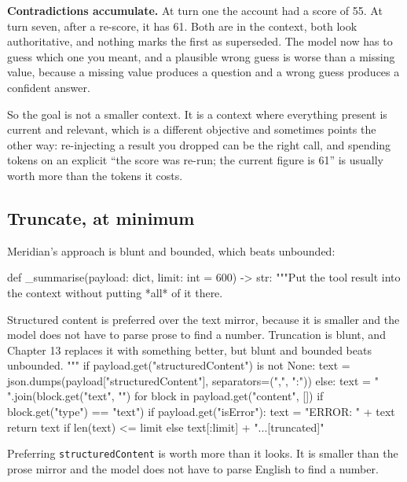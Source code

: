 \textbf{Contradictions accumulate.} At turn one the account had a score of 55. At
turn seven, after a re-score, it has 61. Both are in the context, both look
authoritative, and nothing marks the first as superseded. The model now has to
guess which one you meant, and a plausible wrong guess is worse than a missing
value, because a missing value produces a question and a wrong guess produces a
confident answer.

So the goal is not a smaller context. It is a context where everything present is
current and relevant, which is a different objective and sometimes points the
other way: re-injecting a result you dropped can be the right call, and spending
tokens on an explicit ``the score was re-run; the current figure is 61'' is
usually worth more than the tokens it costs.


\subsection{Truncate, at minimum}

Meridian's approach is blunt and bounded, which beats unbounded:

\begin{py}
def _summarise(payload: dict, limit: int = 600) -> str:
    """Put the tool result into the context without putting *all* of it there.

    Structured content is preferred over the text mirror, because it is smaller
    and the model does not have to parse prose to find a number. Truncation is
    blunt, and Chapter 13 replaces it with something better, but blunt and
    bounded beats unbounded.
    """
    if payload.get("structuredContent") is not None:
        text = json.dumps(payload["structuredContent"], separators=(",", ":"))
    else:
        text = " ".join(block.get("text", "")
                        for block in payload.get("content", [])
                        if block.get("type") == "text")
    if payload.get("isError"):
        text = "ERROR: " + text
    return text if len(text) <= limit else text[:limit] + "...[truncated]"
\end{py}

Preferring \texttt{structuredContent} is worth more than it looks. It is smaller
than the prose mirror and the model does not have to parse English to find a
number.


